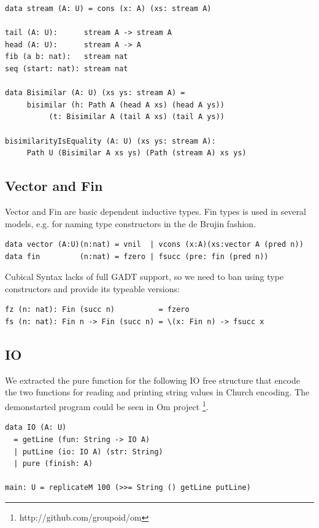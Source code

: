 \documentclass{article}
\begin{document}
\begin{lstlisting}[mathescape=true]
data stream (A: U) = cons (x: A) (xs: stream A)

tail (A: U):      stream A -> stream A
head (A: U):      stream A -> A
fib (a b: nat):   stream nat
seq (start: nat): stream nat

data Bisimilar (A: U) (xs ys: stream A) =
     bisimilar (h: Path A (head A xs) (head A ys))
          (t: Bisimilar A (tail A xs) (tail A ys))

bisimilarityIsEquality (A: U) (xs ys: stream A):
     Path U (Bisimilar A xs ys) (Path (stream A) xs ys)
\end{lstlisting}

\subsection{Vector and Fin}

Vector and Fin are basic dependent inductive types. Fin types is used
in several models, e.g. for naming type constructors in the de Brujin fashion.

\begin{lstlisting}[mathescape=true]
data vector (A:U)(n:nat) = vnil  | vcons (x:A)(xs:vector A (pred n))
data fin         (n:nat) = fzero | fsucc (pre: fin (pred n))
\end{lstlisting}

Cubical Syntax lacks of full GADT support, so we need to ban using
type constructors and provide its typeable versions:

\begin{lstlisting}[mathescape=true]
fz (n: nat): Fin (succ n)          = fzero
fs (n: nat): Fin n -> Fin (succ n) = \(x: Fin n) -> fsucc x
\end{lstlisting}

\subsection{IO}

We extracted the pure function for the following IO free structure
that encode the two functions for reading and printing string values in Church encoding.
The demonstarted program could be seen in Om project \footnote{http://github.com/groupoid/om}.

\begin{lstlisting}[mathescape=true]
data IO (A: U)
  = getLine (fun: String -> IO A)
  | putLine (io: IO A) (str: String)
  | pure (finish: A)

main: U = replicateM 100 (>>= String () getLine putLine)
\end{lstlisting}
\end{document}
